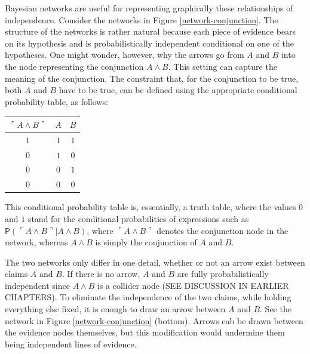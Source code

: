 \documentclass[10pt,dvipsnames,enabledeprecatedfontcommands]{scrartcl}
\newcommand{\pr}[1]{\mathsf{P}(#1)}
\begin{document}
Bayesian networks are useful for representing graphically these
relationships of independence. Consider the networks in Figure
\ref{network-conjunction}. The structure of the networks is rather
natural because each piece of evidence bears on its hypothesis and is
probabilistically independent conditional on one of the hypotheses. One
might wonder, however, why the arrows go from \(A\) and \(B\) into the
node representing the conjunction \(A\wedge B\). This setting can
capture the meaning of the conjunction. The constraint that, for the
conjunction to be true, both \(A\) and \(B\) have to be true, can be
defined using the appropriate conditional probability table, as follows:

\begin{center}
\begin{tabular}{ c | c c}
$\ulcorner A\wedge B \urcorner$  & $A$  & $B$\\
\hline
$1$  & $1$  & $1$\\
$0$  & $1$  & $0$\\
$0$  & $0$  & $1$\\
$0$  & $0$  & $0$\\
\end{tabular}
\end{center}

\noindent This conditional probability table is, essentially, a truth
table, where the values \(0\) and \(1\) stand for the conditional
probabilities of expressions such as
\(\pr{\ulcorner A\wedge B \urcorner \vert A \wedge B}\), where
\(\ulcorner A\wedge B \urcorner\) denotes the conjunction node in the
network, whereas \(A \wedge B\) is simply the conjunction of \(A\) and
\(B\).

The two networks only differ in one detail, whether or not an arrow
exist between claims \(A\) and \(B\). If there is no arrow, \(A\) and
\(B\) are fully probabilistically independent since \(A\wedge B\) is a
collider node (SEE DISCUSSION IN EARLIER CHAPTERS). To eliminate the
independence of the two claims, while holding everything else fixed, it
is enough to draw an arrow between \(A\) and \(B\). See the network in
Figure \ref{network-conjunction} (bottom). Arrows cab be drawn between
the evidence nodes themselves, but this modification would undermine
them being independent lines of evidence.
\end{document}
